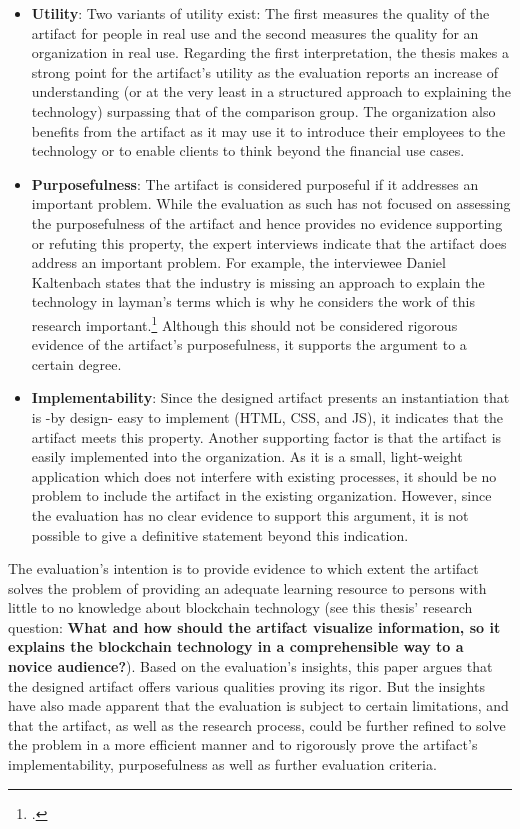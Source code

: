 \begin{itemize}
    \item \textbf{Utility}: Two variants of utility exist: The first measures the quality of the artifact for people in real use and the second measures the quality for an organization in real use. Regarding the first interpretation, the thesis makes a strong point for the artifact's utility as the evaluation reports an increase of understanding (or at the very least in a structured approach to explaining the technology) surpassing that of the comparison group. The organization also benefits from the artifact as it may use it to introduce their employees to the technology or to enable clients to think beyond the financial use cases.
    \item \textbf{Purposefulness}: The artifact is considered purposeful if it addresses an important problem. While the evaluation as such has not focused on assessing the purposefulness of the artifact and hence provides no evidence supporting or refuting this property, the expert interviews indicate that the artifact does address an important problem. For example, the interviewee Daniel Kaltenbach states that the industry is missing an approach to explain the technology in layman's terms which is why he considers the work of this research important.\footcites[Cf.][]{DanielKaltenbach_Interview} Although this should not be considered rigorous evidence of the artifact's purposefulness, it supports the argument to a certain degree.
    \item \textbf{Implementability}: Since the designed artifact presents an instantiation that is -by design- easy to implement (\ac{HTML}, \ac{CSS}, and \ac{JS}), it indicates that the artifact meets this property. Another supporting factor is that the artifact is easily implemented into the organization. As it is a small, light-weight application which does not interfere with existing processes, it should be no problem to include the artifact in the existing organization. However, since the evaluation has no clear evidence to support this argument, it is not possible to give a definitive statement beyond this indication.
\end{itemize}

The evaluation's intention is to provide evidence to which extent the artifact solves the problem of providing an adequate learning resource to persons with little to no knowledge about blockchain technology (see this thesis' research question: \textbf{What and how should the artifact visualize information, so it explains the blockchain technology in a comprehensible way to a novice audience?}).
Based on the evaluation's insights, this paper argues that the designed artifact offers various qualities proving its rigor. But the insights have also made apparent that the evaluation is subject to certain limitations, and that the artifact, as well as the research process, could be further refined to solve the problem in a more efficient manner and to rigorously prove the artifact's implementability, purposefulness as well as further evaluation criteria. 


